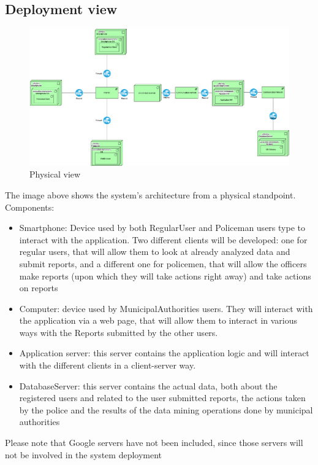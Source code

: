 \newpage
\subsection{Deployment view}

\begin{figure}[h!]
	\centering
	\includegraphics[width=\textwidth]{Images/physical_view}
	\caption{Physical view}
\end{figure}

The image above shows the system's architecture from a physical standpoint.
Components:
\begin{itemize}
\item Smartphone: Device used by both RegularUser and Policeman users type to interact with the application. Two different clients will be developed: one for regular users, that will allow them to look at already analyzed data and submit reports, and a different one for policemen, that will allow the officers make reports (upon which they will take actions right away) and take actions on reports
\item Computer: device used by MunicipalAuthorities users. They will interact with the application via a web page, that will allow them to interact in various ways with the Reports submitted by the other users.
\item Application server: this server contains the application logic and will interact with the different clients in a client-server way.
\item DatabaseServer: this server contains the actual data, both about the registered users and related to the user submitted reports, the actions taken by the police and the results of the data mining operations done by municipal authorities
\end{itemize}
Please note that Google servers have not been included, since those servers will not be involved in the system deployment
\newpage


